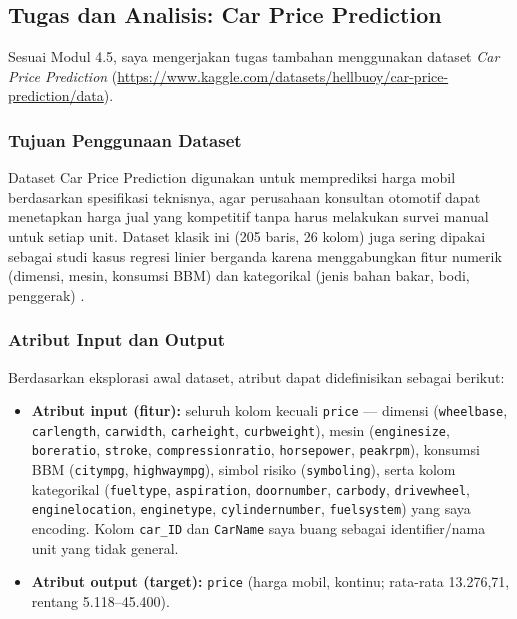 \documentclass[a4paper,oneside,12pt]{report}
\begin{document}
\subsection{Tugas dan Analisis: Car Price Prediction}
Sesuai Modul 4.5, saya mengerjakan tugas tambahan menggunakan dataset \textit{Car Price Prediction} (\url{https://www.kaggle.com/datasets/hellbuoy/car-price-prediction/data}).

\subsubsection{Tujuan Penggunaan Dataset}
Dataset Car Price Prediction digunakan untuk memprediksi harga mobil berdasarkan spesifikasi teknisnya, agar perusahaan konsultan otomotif dapat menetapkan harga jual yang kompetitif tanpa harus melakukan survei manual untuk setiap unit. Dataset klasik ini (205 baris, 26 kolom) juga sering dipakai sebagai studi kasus regresi linier berganda karena menggabungkan fitur numerik (dimensi, mesin, konsumsi BBM) dan kategorikal (jenis bahan bakar, bodi, penggerak) \cite{kaggle-car,car-mirror}.

\subsubsection{Atribut Input dan Output}
Berdasarkan eksplorasi awal dataset, atribut dapat didefinisikan sebagai berikut:
\begin{itemize}
    \item \textbf{Atribut input (fitur):} seluruh kolom kecuali \texttt{price} --- dimensi (\texttt{wheelbase}, \texttt{carlength}, \texttt{carwidth}, \texttt{carheight}, \texttt{curbweight}), mesin (\texttt{enginesize}, \texttt{boreratio}, \texttt{stroke}, \texttt{compressionratio}, \texttt{horsepower}, \texttt{peakrpm}), konsumsi BBM (\texttt{citympg}, \texttt{highwaympg}), simbol risiko (\texttt{symboling}), serta kolom kategorikal (\texttt{fueltype}, \texttt{aspiration}, \texttt{doornumber}, \texttt{carbody}, \texttt{drivewheel}, \texttt{enginelocation}, \texttt{enginetype}, \texttt{cylindernumber}, \texttt{fuelsystem}) yang saya encoding. Kolom \texttt{car\_ID} dan \texttt{CarName} saya buang sebagai identifier/nama unit yang tidak general.
    \item \textbf{Atribut output (target):} \texttt{price} (harga mobil, kontinu; rata-rata 13.276,71, rentang 5.118--45.400).
\end{itemize}
\end{document}
